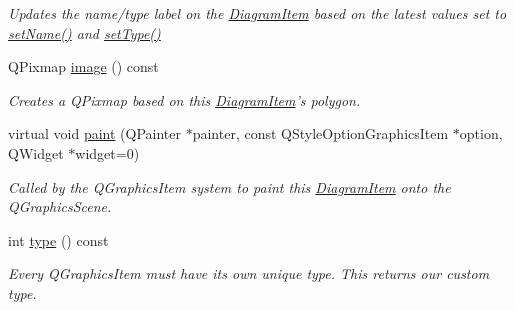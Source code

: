 \begin{DoxyCompactItemize}
\begin{DoxyCompactList}\small\item\em Updates the name/type label on the \hyperlink{class_diagram_item}{Diagram\-Item} based on the latest values set to \hyperlink{class_diagram_item_ae1363bc6b79c0f9e0dc5e4c1dc90cb51}{set\-Name()} and \hyperlink{class_diagram_item_a923ea9e62ea16ded388877e9681fe9e3}{set\-Type()} \end{DoxyCompactList}\item 
Q\-Pixmap \hyperlink{class_diagram_item_a355f5719b096dbb89375a54be2ee3890}{image} () const 
\begin{DoxyCompactList}\small\item\em Creates a Q\-Pixmap based on this \hyperlink{class_diagram_item}{Diagram\-Item}'s polygon. \end{DoxyCompactList}\item 
virtual void \hyperlink{class_diagram_item_a3a11a30164ef7c891c911a8f7277e2b5}{paint} (Q\-Painter $\ast$painter, const Q\-Style\-Option\-Graphics\-Item $\ast$option, Q\-Widget $\ast$widget=0)
\begin{DoxyCompactList}\small\item\em Called by the Q\-Graphics\-Item system to paint this \hyperlink{class_diagram_item}{Diagram\-Item} onto the Q\-Graphics\-Scene. \end{DoxyCompactList}\item 
int \hyperlink{class_diagram_item_a4851c7c4ea5fbb3e137c074082ebf84b}{type} () const 
\begin{DoxyCompactList}\small\item\em Every Q\-Graphics\-Item must have its own unique type. This returns our custom type. \end{DoxyCompactList}\end{DoxyCompactItemize}
